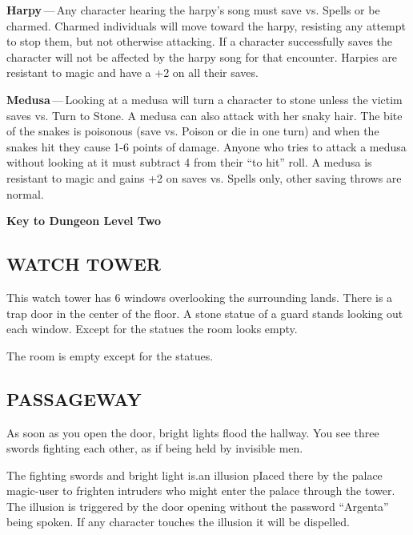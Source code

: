 \documentclass[letterpaper,serif,tightsqueeze]{module}
\begin{document}
{\textbf{Harpy}\,---\,Any character hearing the harpy's song must save vs. Spells or be charmed. Charmed individuals will move toward the harpy,
resisting any attempt to stop them, but not otherwise attacking. If a character successfully saves the character will not be affected by the harpy
song for that encounter. Harpies are resistant to magic and have a +2 on all their saves.

\textbf{Medusa}\,---\,Looking at a medusa will turn a character to stone unless the victim saves vs. Turn to Stone. A medusa can also attack with her
snaky hair. The bite of the snakes is poisonous (save vs. Poison or die in one turn) and when the snakes hit they cause 1-6 points of damage.
Anyone who tries to attack a medusa without looking at it must subtract 4 from their ``to hit'' roll. A medusa is resistant to magic and gains +2 on
saves vs. Spells only, other saving throws are normal.\vspace{-1ex}

\hrulefill
\begin{center}
\textbf{Key to Dungeon Level Two}
\end{center}}
\subsection{WATCH TOWER}
\begin{boxtext}
This watch tower has 6 windows overlooking the surrounding
lands. There is a trap door in the center of the floor. A stone
statue of a guard stands looking out each window. Except for
the statues the room looks empty.
\end{boxtext}
The room is empty except for the statues.
\subsection{PASSAGEWAY}
\begin{boxtext}
As soon as you open the door, bright lights flood the hallway.
You see three swords fighting each other, as if being held by
invisible men.
\end{boxtext}
The fighting swords and bright light is.an illusion pIaced there by
the palace magic-user to frighten intruders who might enter the
palace through the tower. The illusion is triggered by the door
opening without the password ``Argenta'' being spoken. If any
character touches the illusion it will be dispelled.
\end{document}

